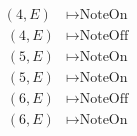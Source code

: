 \documentclass[preview]{standalone}
\begin{document}
\begin{align*}
(4,E) & \mapsto \text{NoteOn} \\ \
        (4,E) & \mapsto \text{NoteOff} \\ \
        (5,E) & \mapsto \text{NoteOn} \\ \
        (5,E) & \mapsto \text{NoteOn} \\ \
        (6,E) & \mapsto \text{NoteOff} \\ \
        (6,E) & \mapsto \text{NoteOn} \\
\end{align*}
\end{document}
